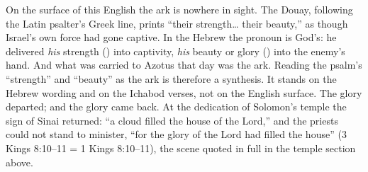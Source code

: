 On the surface of this English the ark is nowhere in sight. The Douay,
following the Latin psalter's Greek line, prints ``their strength\ldots{}
their beauty,'' as though Israel's own force had gone captive. In the
Hebrew the pronoun is God's: he delivered \emph{his} strength
() into captivity, \emph{his} beauty or glory ()
into the enemy's hand. And what was carried to Azotus that day was the
ark. Reading the psalm's ``strength'' and ``beauty'' as the ark is
therefore a synthesis. It stands on the Hebrew wording and on the
Ichabod verses, not on the English surface. The glory departed; and the glory came
back. At the dedication of Solomon's temple the sign of Sinai
returned: ``a cloud filled the house of the Lord,'' and the priests
could not stand to minister, ``for the glory of the Lord had filled the
house'' (3 Kings 8:10--11 = 1 Kings 8:10--11), the scene quoted in full
in the temple section above.

